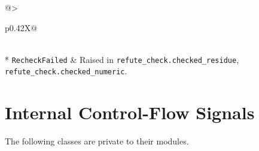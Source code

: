 {\begin{xltabular}{\linewidth}{@{}>{\raggedright\arraybackslash}p{0.42\linewidth}X@{}}
\midrule
{}\\*
\texttt{RecheckFailed}\newline{} & Raised in \texttt{refute\_\allowbreak{}check.\allowbreak{}checked\_\allowbreak{}residue}, \texttt{refute\_\allowbreak{}check.\allowbreak{}checked\_\allowbreak{}numeric}. \\
\end{xltabular}
}

\section{Internal Control-Flow Signals}\label{sec:errors-internal}

The following classes are private to their modules.

